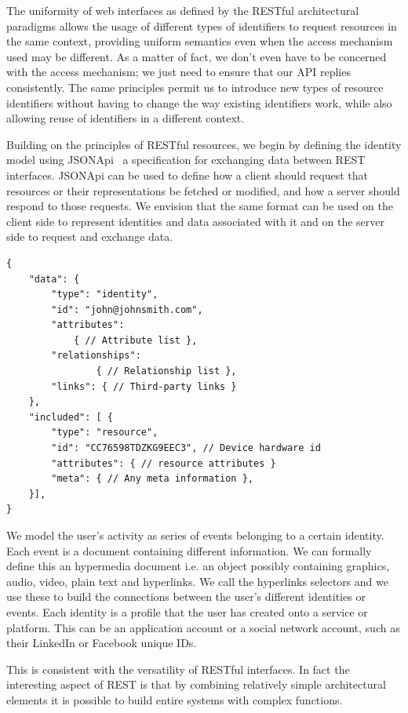 The uniformity of web interfaces as defined by the RESTful architectural paradigms allows the usage of different types of identifiers to request resources in the same context, providing uniform semantics even when the access mechanism used may be different. As a matter of fact, we don't even have to be concerned with the access mechanism; we just need to ensure that our API replies consistently. The same principles permit us to introduce new types of resource identifiers without having to change the way existing identifiers work, while also allowing reuse of identifiers in a different context.

Building on the principles of RESTful resources, we begin by defining the identity model using JSONApi~\cite{Jsonapi} a specification for exchanging data between REST interfaces. JSONApi can be used to define how a client should request that resources or their representations be fetched or modified, and how a server should respond to those requests. We envision that the same format can be used on the client side to represent identities and data associated with it and on the server side to request and exchange data.

\begin{lstlisting}
{
    "data": {
        "type": "identity",
        "id": "john@johnsmith.com",
        "attributes":
            { // Attribute list },
        "relationships":
                { // Relationship list },
        "links": { // Third-party links }
    },
    "included": [ {
        "type": "resource",
        "id": "CC76598TDZKG9EEC3", // Device hardware id
        "attributes": { // resource attributes }
        "meta": { // Any meta information },
    }],
}
\end{lstlisting}

We model the user's activity as series of events belonging to a certain identity. Each event is a document containing different information. We can formally define this an hypermedia document i.e. an object possibly containing graphics, audio, video, plain text and hyperlinks. We call the hyperlinks selectors and we use these to build the connections between the user's different identities or events. Each identity is a profile that the user has created onto a service or platform. This can be an application account or a social network account, such as their LinkedIn or Facebook unique IDs.

This is consistent with the versatility of RESTful interfaces. In fact the interesting aspect of REST is that by combining relatively simple architectural elements it is possible to build entire systems with complex functions.

